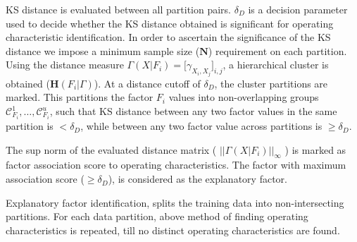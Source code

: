 \documentclass[twoside,leqno,twocolumn]{article}
\begin{document}
 KS distance is evaluated between all partition pairs. $\delta_{D}$ is a decision parameter used to decide whether the KS distance obtained is significant for operating characteristic identification. In order to ascertain the significance of the KS distance we impose a minimum sample size ($\mathbf{N}$) requirement on each partition. Using the distance measure $\Gamma(X\vert F_i) = \Big[\gamma_{X_i,X_j}\Big]_{i,j}$, a hierarchical cluster is obtained ($\mathbf{H}(F_i\vert\Gamma)$). At a distance cutoff of $\delta_{D}$, the cluster partitions are marked. This partitions the factor $F_i$ values into non-overlapping groups $\mathcal{C}^{1}_{F_i},\dots,\mathcal{C}^{u}_{F_i}$, such that KS distance between any two factor values in the same partition is $< \delta_{D}$, while between any two factor value across partitions is $\geq \delta_{D}$. 
\par
The sup norm of the evaluated distance matrix ( ${\vert\vert \Gamma(X\vert F_i) \vert\vert}_{\infty}$ ) is marked as factor association score to operating characteristics. The factor with maximum association score ($\geq \delta_{D}$), is considered as the explanatory factor.
\par
Explanatory factor identification, splits the training data into non-intersecting partitions. For each data partition, above method of finding operating characteristics is repeated, till no distinct operating characteristics are found. 
\end{document}
